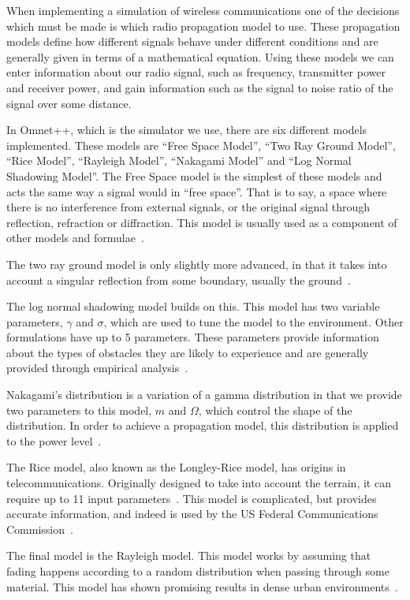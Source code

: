     When implementing a simulation of wireless communications one of the decisions which must be made is which radio propagation model to use. These propagation models define how different signals behave under different conditions and are generally given in terms of a mathematical equation. Using these models we can enter information about our radio signal, such as frequency, transmitter power and receiver power,  and gain information such as the signal to noise ratio of the signal over some distance.

    In Omnet++, which is the simulator we use, there are six different models implemented. These models are ``Free Space Model'', ``Two Ray Ground Model'', ``Rice Model'', ``Rayleigh Model'', ``Nakagami Model'' and ``Log Normal Shadowing Model''. The Free Space model is the simplest of these models and acts the same way a signal would in ``free space''. That is to say, a space where there is no interference from external signals, or the original signal through reflection, refraction or diffraction. This model is usually used as a component of other models and formulae~\cite{friis1946note}.

    The two ray ground model is only slightly more advanced, in that it takes into account a singular reflection from some boundary, usually the ground~\cite{tworaygroundmodel}.

    The log normal shadowing model builds on this. This model has two variable parameters, $\gamma$ and $\sigma$, which are used to tune the model to the environment. Other formulations have up to 5 parameters. These parameters provide information about the types of obstacles they are likely to experience and are generally provided through empirical analysis~\cite{goldhirsh1998handbook}.

    Nakagami's distribution is a variation of a gamma distribution in that we provide two parameters to this model, $m$ and $\Omega$, which control the shape of the distribution. In order to achieve a propagation model, this distribution is applied to the power level~\cite{nakagamipowerlevel}.

    The Rice model, also known as the Longley-Rice model, has origins in telecommunications. Originally designed to take into account the terrain, it can require up to 11 input parameters~\cite{ricemodel}. This model is complicated, but provides accurate information, and indeed is used by the US Federal Communications Commission~\cite{fcclongleyrice}.

    The final model is the Rayleigh model. This model works by assuming that fading happens according to a random distribution when passing through some material. This model has shown promising results in dense urban environments~\cite{rayleighmanhattan}.



